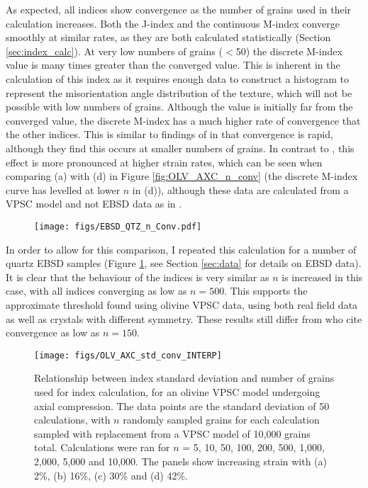 \documentclass[a4paper,12pt,twoside]{report}
\numberwithin{equation}{chapter}
\begin{document}
As expected, all indices show convergence as the number of grains used in their calculation increases. Both the J-index and the continuous M-index converge smoothly at similar rates, as they are both calculated statistically (Section \ref{sec:index_calc}). At very low numbers of grains ($<$50) the discrete M-index value is many times greater than the converged value. This is inherent in the calculation of this index as it requires enough data to construct a histogram to represent the misorientation angle distribution of the texture, which will not be possible with low numbers of grains. Although the value is initially far from the converged value, the discrete M-index has a much higher rate of convergence that the other indices. This is similar to findings of \cite{Skemer} in that convergence is rapid, although they find this occurs at smaller numbers of grains. In contrast to \cite{Skemer}, this effect is more pronounced at higher strain rates, which can be seen when comparing (a) with (d) in Figure \ref{fig:OLV_AXC_n_conv} (the discrete M-index curve has levelled at lower $n$ in (d)), although these data are calculated from a VPSC model and not EBSD data as in \cite{Skemer}.

\begin{figure}[t!]
  \centering
    \texttt{[image: figs/EBSD\_QTZ\_n\_Conv.pdf]}
  \caption[Convergence with no. of grains (quartz EBSD)]{}
  \label{fig:EBSD_QTZ_n_conv}
\end{figure}

In order to allow for this comparison, I repeated this calculation for a number of quartz EBSD samples (Figure \ref{fig:EBSD_QTZ_n_conv}, see Section \ref{sec:data} for details on EBSD data). It is clear that the behaviour of the indices is very similar as $n$ is increased in this case, with all indices converging as low as $n = 500$. This supports the approximate threshold found using olivine VPSC data, using both real field data as well as crystals with  different symmetry. These results still differ from \cite{Skemer} who cite convergence as low as $n = 150$. 

      
\begin{figure}[h!]
  \centering
    \texttt{[image: figs/OLV\_AXC\_std\_conv\_INTERP]}
  \caption[Index error with no. grains (olivine)]{Relationship between index standard deviation and number of grains used for index calculation, for an olivine VPSC model undergoing axial compression. The data points are the standard deviation of 50 calculations, with $n$ randomly sampled grains for each calculation sampled with replacement from a VPSC model of 10,000 grains total. Calculations were ran for $n$ = 5, 10, 50, 100, 200, 500, 1,000, 2,000, 5,000 and 10,000. The panels show increasing strain with (a) 2\%, (b) 16\%, (c) 30\% and (d) 42\%. }
  \label{fig:OLV_AXC_n_conv_err}
\end{figure}
\end{document}
